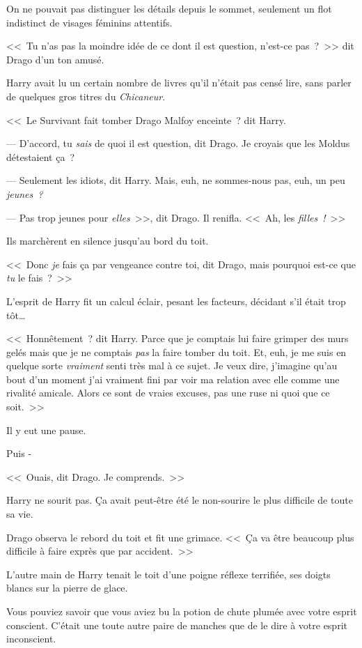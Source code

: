 \later

On ne pouvait pas distinguer les détails depuis le sommet, seulement un flot indistinct de visages féminins attentifs.

<<~Tu n'as pas la moindre idée de ce dont il est question, n'est-ce pas~?~>> dit Drago d'un ton amusé.

Harry avait lu un certain nombre de livres qu'il n'était pas censé lire, sans parler de quelques gros titres du \emph{Chicaneur}.

<<~Le Survivant fait tomber Drago Malfoy enceinte~? dit Harry.

--- D'accord, tu \emph{sais} de quoi il est question, dit Drago. Je croyais que les Moldus détestaient ça~?

--- Seulement les idiots, dit Harry. Mais, euh, ne sommes-nous pas, euh, un peu \emph{jeunes~?}

--- Pas trop jeunes pour \emph{elles}~>>, dit Drago. Il renifla. <<~Ah, les \emph{filles~!}~>>

Ils marchèrent en silence jusqu'au bord du toit.

<<~Donc \emph{je} fais ça par vengeance contre toi, dit Drago, mais pourquoi est-ce que \emph{tu} le fais~?~>>

L'esprit de Harry fit un calcul éclair, pesant les facteurs, décidant s'il était trop tôt…

<<~Honnêtement~? dit Harry. Parce que je comptais lui faire grimper des murs gelés mais que je ne comptais \emph{pas} la faire tomber du toit. Et, euh, je me suis en quelque sorte \emph{vraiment} senti très mal à ce sujet. Je veux dire, j'imagine qu'au bout d'un moment j'ai vraiment fini par voir ma relation avec elle comme une rivalité amicale. Alors ce sont de vraies excuses, pas une ruse ni quoi que ce soit.~>>

Il y eut une pause.

Puis -

<<~Ouais, dit Drago. Je comprends.~>>

Harry ne sourit pas. Ça avait peut-être été le non-sourire le plus difficile de toute sa vie.

Drago observa le rebord du toit et fit une grimace. <<~Ça va être beaucoup plus difficile à faire exprès que par accident.~>>

\later

L'autre main de Harry tenait le toit d'une poigne réflexe terrifiée, ses doigts blancs sur la pierre de glace.

Vous pouviez savoir que vous aviez bu la potion de chute plumée avec votre esprit conscient. C'était une toute autre paire de manches que de le dire à votre esprit inconscient.

